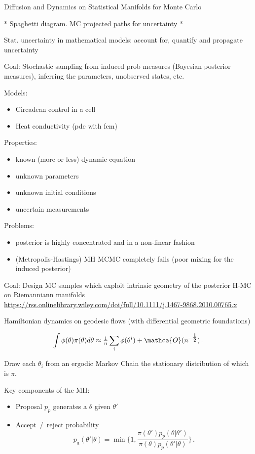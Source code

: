 Diffusion and Dynamics on Statistical Manifolds for Monte Carlo

* Spaghetti diagram. MC projected paths for uncertainty *

Stat. uncertainty in mathematical models: account for, quantify and propagate uncertainty

Goal: Stochastic sampling from induced prob measures (Bayesian posterior measures),
inferring the parameters, unobserved states, etc.

Models:
\begin{itemize}
    \item Circadean control in a cell
    \item Heat conductivity (pde with fem)
\end{itemize}

Properties:
\begin{itemize}
    \item known (more or less) dynamic equation
    \item unknown parameters
    \item unknown initial conditions
    \item uncertain measurements
\end{itemize}

Problems:
\begin{itemize}
    \item posterior is highly concentrated and in a non-linear fashion
    \item (Metropolis-Hastings) MH MCMC completely fails (poor mixing for the induced posterior)
\end{itemize}

Goal: Design MC samples which exploit intrinsic geometry of the posterior
H-MC on Riemanniann manifolds \url{https://rss.onlinelibrary.wiley.com/doi/full/10.1111/j.1467-9868.2010.00765.x}

Hamiltonian dynamics on geodesic flows (with differential geometric foundations)


$$
\int \phi(\theta) \pi(\theta) d\theta
    \approx \tfrac1n \sum_i \phi(\theta^i) + \mathca{O}(n^{-\tfrac12})
\,. $$

Draw each $\theta_i$ from an ergodic Markov Chain the stationary distribution of which is $\pi$.

Key components of the MH:
\begin{itemize}
    \item Proposal $p_p$ generates a $\theta$ given $\theta'$
    \item Accept~/~reject probability
    $$
    p_a(\theta'\vert \theta)
        = \min\bigl\{
            1, \frac{
                \pi(\theta') p_p(\theta \vert \theta')
            }{
                \pi(\theta) p_p(\theta'\vert \theta)
            }
        \bigr\}
        \,. $$
\end{itemize}

